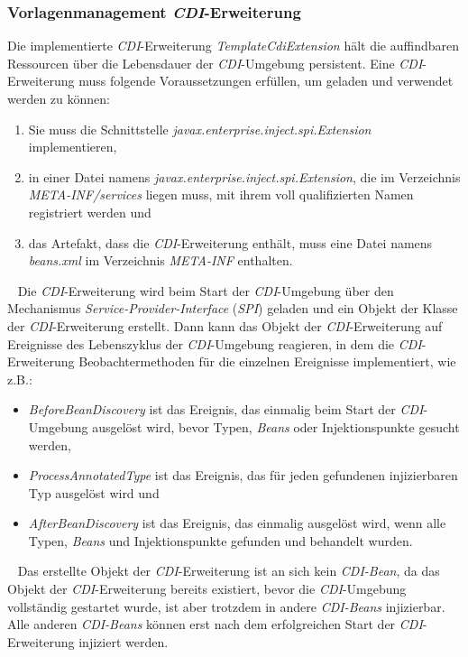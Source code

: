 \subsubsection{Vorlagenmanagement \emph{CDI}-Erweiterung}
Die implementierte \emph{CDI}-Erweiterung \emph{TemplateCdiExtension} hält die auffindbaren Ressourcen über die Lebensdauer der \emph{CDI}-Umgebung persistent. Eine \emph{CDI}-Erweiterung muss folgende Voraussetzungen erfüllen, um geladen und verwendet werden zu können:
\begin{enumerate}
	\item Sie muss die Schnittstelle \emph{javax.enterprise.inject.spi.Extension} implementieren,
	\item in einer Datei namens \emph{javax.enterprise.inject.spi.Extension}, die im Verzeichnis \emph{META-INF/services} liegen muss, mit ihrem voll qualifizierten Namen registriert werden und
	\item das Artefakt, dass die \emph{CDI}-Erweiterung enthält, muss eine Datei namens \emph{beans.xml} im Verzeichnis \emph{META-INF} enthalten.
\end{enumerate}
\ \newline
Die \emph{CDI}-Erweiterung wird beim Start der \emph{CDI}-Umgebung über den Mechanismus \emph{Service-Provider-Interface} (\emph{SPI}) geladen und ein Objekt der Klasse der \emph{CDI}-Erweiterung erstellt. Dann kann das Objekt der \emph{CDI}-Erweiterung auf Ereignisse des Lebenszyklus der \emph{CDI}-Umgebung reagieren, in dem die \emph{CDI}-Erweiterung Beobachtermethoden für die einzelnen Ereignisse implementiert, wie z.B.:
\begin{itemize}
	\item\emph{BeforeBeanDiscovery} ist das Ereignis, das einmalig beim Start der \emph{CDI}-Umgebung ausgelöst wird, bevor Typen, \emph{Beans} oder Injektionspunkte gesucht werden,
	\item\emph{ProcessAnnotatedType} ist das Ereignis, das für jeden gefundenen injizierbaren Typ ausgelöst wird und
	\item\emph{AfterBeanDiscovery} ist das Ereignis, das einmalig ausgelöst wird, wenn alle Typen, \emph{Beans} und Injektionspunkte gefunden und behandelt wurden.
\end{itemize}
\ \newline
Das erstellte Objekt der \emph{CDI}-Erweiterung ist an sich kein \emph{CDI-Bean}, da das Objekt der \emph{CDI}-Erweiterung bereits existiert, bevor die \emph{CDI}-Umgebung vollständig gestartet wurde, ist aber trotzdem in andere \emph{CDI-Beans} injizierbar. Alle anderen \emph{CDI-Beans} können erst nach dem erfolgreichen Start der \emph{CDI}-Erweiterung injiziert werden.
